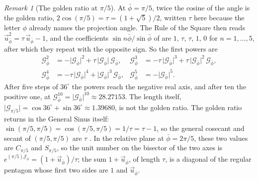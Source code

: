 \documentclass[11pt,a4paper]{amsart}
\theoremstyle{plain}
\theoremstyle{definition}
\theoremstyle{remark}
\newtheorem{remark}[theorem]{Remark}
\newcommand{\pb}{\bar{\phi}}                     %
\newcommand{\Gp}{\mathcal{G}_{\bar{\phi}}}       %
\newcommand{\up}{\vec{u}_{\bar{\phi}}}           %
\newcommand{\Jp}{\mathcal{J}_{\bar{\phi}}}       %
\begin{document}
\begin{remark}[The golden ratio at $\pi/5$]\label{rem:golden}
At $\pb = \pi/5$, twice the cosine of the angle is the golden ratio, $2\cos(\pi/5) = \tau = (1 + \sqrt{5})/2$, written $\tau$ here because the letter $\phi$ already names the projection angle. The Rule of the Square then reads $\up^2 = \tau\,\up - 1$, and the coefficients $\sin n\pb/\sin\pb$ of  are $1$, $\tau$, $\tau$, $1$, $0$ for $n = 1, \dots, 5$, after which they repeat with the opposite sign. So the first powers are
\begin{align*}
\Gp^2 &= -\lvert\Gp\rvert^2 + \tau\,\lvert\Gp\rvert\,\Gp , & \Gp^3 &= -\tau\,\lvert\Gp\rvert^3 + \tau\,\lvert\Gp\rvert^2\,\Gp , \\
\Gp^4 &= -\tau\,\lvert\Gp\rvert^4 + \lvert\Gp\rvert^3\,\Gp , & \Gp^5 &= -\lvert\Gp\rvert^5 .
\end{align*}
After five steps of $36^\circ$ the powers reach the negative real axis, and after ten the positive one, at $\Gp^{10} = \lvert\Gp\rvert^{10} \approx 28.27153$. The length itself, $\lvert\mathcal{G}_{\pi/5}\rvert = \cos 36^\circ + \sin 36^\circ \approx 1.39680$, is not the golden ratio. The golden ratio returns in the General Sinus itself: $\sin(\pi/5, \pi/5) = \cos(\pi/5, \pi/5) = 1/\tau = \tau - 1$, so the general cosecant and secant of $(\pi/5, \pi/5)$ are $\tau$ \citep[Remark~4.8]{Derraz2026GSP}. In the relative plane at $\pb = 2\pi/5$, these two values are $C_{\pi/5}$ and $S_{\pi/5}$, so the unit number on the bisector of the two axes is $e^{(\pi/5)\Jp} = (1 + \up)/\tau$; the sum $1 + \up$, of length $\tau$, is a diagonal of the regular pentagon whose first two sides are $1$ and $\up$.
\end{remark}
\end{document}
